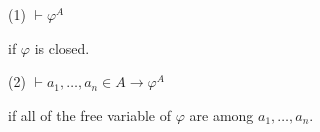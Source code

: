 (1) $\vdash \varphi^A$

if $\varphi$ is closed.

(2) $\vdash a_1, \ldots, a_n \in A \rightarrow \varphi^A$

if all of the free variable of $\varphi$ are among $a_1, \ldots, a_n$.
